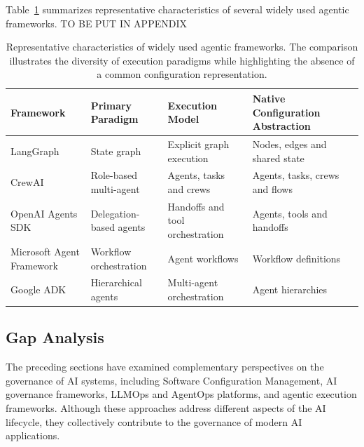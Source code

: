 \documentclass[10pt]{article}
\begin{document}
Table~\ref{tab:framework_comparison} summarizes representative characteristics of several widely used agentic frameworks. TO BE PUT IN APPENDIX
\begin{table}[t]
\centering
\caption{Representative characteristics of widely used agentic frameworks. The comparison illustrates the diversity of execution paradigms while highlighting the absence of a common configuration representation.}
\label{tab:framework_comparison}

\renewcommand{\arraystretch}{1.15}

\begin{tabular}{p{3.2cm}p{3.1cm}p{3.4cm}p{3.4cm}c}
\toprule
\textbf{Framework}
&
\textbf{Primary Paradigm}
&
\textbf{Execution Model}
&
\textbf{Native Configuration Abstraction}
\\
\midrule

LangGraph
&
State graph
&
Explicit graph execution
&
Nodes, edges and shared state
\\

CrewAI
&
Role-based multi-agent
&
Agents, tasks and crews
&
Agents, tasks, crews and flows
\\

OpenAI Agents SDK
&
Delegation-based agents
&
Handoffs and tool orchestration
&
Agents, tools and handoffs
\\

Microsoft Agent Framework
&
Workflow orchestration
&
Agent workflows
&
Workflow definitions
\\

Google ADK
&
Hierarchical agents
&
Multi-agent orchestration
&
Agent hierarchies
\\

\bottomrule
\end{tabular}

\end{table}

\subsection{Gap Analysis}
\label{sec:gap_analysis}

The preceding sections have examined complementary perspectives on the governance of AI systems, including Software Configuration Management, AI governance frameworks, LLMOps and AgentOps platforms, and agentic execution frameworks. Although these approaches address different aspects of the AI lifecycle, they collectively contribute to the governance of modern AI applications.
\end{document}
